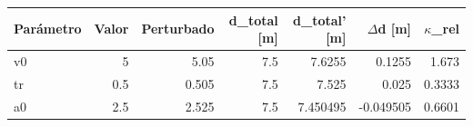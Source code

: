{\footnotesize
\begin{longtable}{lrrrrrr}
\toprule
\textbf{Parámetro} & \textbf{Valor} & \textbf{Perturbado} & \textbf{d\_total [m]} & \textbf{d\_total' [m]} & \textbf{$\Delta$d [m]} & \textbf{$\kappa$\_rel} \\
\midrule
\endhead
v0 & 5 & 5.05 & 7.5 & 7.6255 & 0.1255 & 1.673 \\
tr & 0.5 & 0.505 & 7.5 & 7.525 & 0.025 & 0.3333 \\
a0 & 2.5 & 2.525 & 7.5 & 7.450495 & -0.049505 & 0.6601 \\
\bottomrule
\end{longtable}
}
